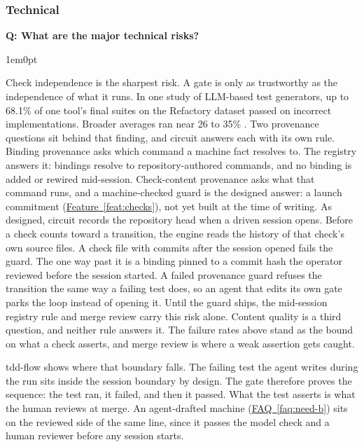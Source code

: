 \documentclass[11pt,letterpaper]{article}
\newcounter{faqnum}
\newenvironment{faqpair}[1]{%
  \needspace{4\baselineskip}%
  \vspace{0.5em}%
  \refstepcounter{faqnum}%
  \noindent\textbf{\color{SectionBlue}Q\thefaqnum: #1}\par\nopagebreak[4]%
  \vspace{0.2em}%
  \begin{adjustwidth}{1em}{0pt}%
  \setlength{\parindent}{0pt}%
}{%
  \end{adjustwidth}%
  \vspace{0.5em}%
}
\newcommand{\faqref}[1]{\hyperref[#1]{FAQ~\ref*{#1}}}
\newcommand{\featureref}[1]{\hyperref[#1]{Feature~\ref*{#1}}}
\begin{document}
\subsubsection*{Technical}

\begin{faqpair}{What are the major technical risks?}
\label{faq:technical-risks}
  Check independence is the sharpest risk. A gate is only as trustworthy as the independence of what it runs. In one study of LLM-based test generators, up to 68.1\% of one tool's final suites on the Refactory dataset passed on incorrect implementations. Broader averages ran near 26 to 35\% \cite{mathews2024testgenerators}. Two provenance questions sit behind that finding, and circuit answers each with its own rule. Binding provenance asks which command a machine fact resolves to. The registry answers it: bindings resolve to repository-authored commands, and no binding is added or rewired mid-session. Check-content provenance asks what that command runs, and a machine-checked guard is the designed answer: a launch commitment (\featureref{feat:checks}), not yet built at the time of writing. As designed, circuit records the repository head when a driven session opens. Before a check counts toward a transition, the engine reads the history of that check's own source files. A check file with commits after the session opened fails the guard. The one way past it is a binding pinned to a commit hash the operator reviewed before the session started. A failed provenance guard refuses the transition the same way a failing test does, so an agent that edits its own gate parks the loop instead of opening it. Until the guard ships, the mid-session registry rule and merge review carry this risk alone. Content quality is a third question, and neither rule answers it. The failure rates above stand as the bound on what a check asserts, and merge review is where a weak assertion gets caught.

  tdd-flow shows where that boundary falls. The failing test the agent writes during the run sits inside the session boundary by design. The gate therefore proves the sequence: the test ran, it failed, and then it passed. What the test asserts is what the human reviews at merge. An agent-drafted machine (\faqref{faq:need-b}) sits on the reviewed side of the same line, since it passes the model check and a human reviewer before any session starts.


\end{faqpair}
\end{document}
